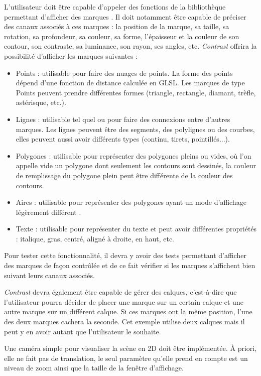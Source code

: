 \documentclass[12pt]{article}
\begin{document}
L'utilisateur doit être capable d'appeler des fonctions de la bibliothèque permettant d'afficher des
\gls{marque}s \cite{VegaMarks}. Il doit notamment être capable de préciser des \gls{canaux} associés à
ces marques : la position de la marque, sa taille, sa rotation, sa profondeur, sa couleur, sa forme,
l'épaisseur et la couleur de son contour, son contraste, sa luminance, son rayon, ses angles, etc.
\textit{Contrast} offrira la possibilité d'afficher les marques suivantes : 
\begin{itemize}
    \item Points : utilisable pour faire des nuages de points. La forme des points dépend d'une fonction de
    distance calculée en GLSL. Les marques de type Points peuvent prendre différentes formes (triangle, rectangle, diamant, trèfle, astérisque, etc.).
    \item Lignes : utilisable tel quel ou pour faire des connexions entre d'autres marques. Les lignes
    peuvent être des segments, des polylignes ou des courbes, elles peuvent aussi avoir différents types
    (continu, tirets, pointillés...).
    \item Polygones : utilisable pour représenter des polygones pleins ou vides, où l'on appelle vide un 
    polygone dont seulement les contours sont dessinés, la couleur de remplissage du polygone plein peut être
    différente de la couleur des contours.
    \item Aires : utilisable pour représenter des polygones ayant un mode d'affichage légèrement différent
    \cite{VegaMarks}.
    \item Texte : utilisable pour représenter du texte et peut avoir différentes propriétés : italique,
    gras, centré, aligné à droite, en haut, etc.
\end{itemize}
    
Pour tester cette fonctionnalité, il devra y avoir des tests permettant d'afficher des marques de façon
contrôlée et de ce fait vérifier si les marques s'affichent bien suivant leurs \gls{canaux} associés.

\textit{Contrast} devra également être capable de gérer des calques, c'est-à-dire que l'utilisateur pourra
décider de placer une marque sur un certain calque et une autre marque sur un différent calque. Si ces
marques ont la même position, l'une des deux marques cachera la seconde. Cet exemple utilise deux calques
mais il peut y en avoir autant que l'utilisateur le souhaite.

Une caméra simple pour visualiser la scène en 2D doit être implémentée. À priori, elle ne fait pas
de translation, le seul paramètre qu'elle prend en compte est un niveau de zoom ainsi que la taille
de la fenêtre d'affichage.
\end{document}
